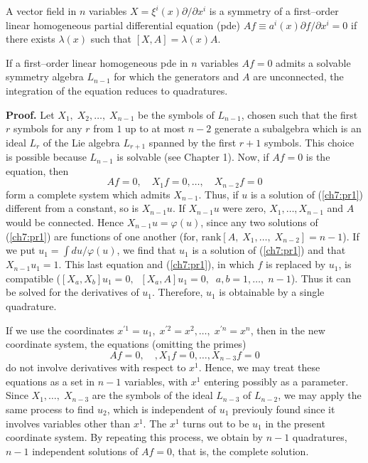 \begin{defi}
\begin{em}
A vector field in $n$ variables $X=\xi^i (x)\partial/\partial x^i$ is a
symmetry of a  first--order linear homogeneous partial differential equation
(pde) $Af\equiv a^i (x)\partial f/\partial x^i =0$ if there exists
$\lambda (x)$ such that $[X,A]=\lambda (x)A$.
\end{em}
\end{defi}

\begin{theo}[Eisenhart 1933]
\label{ch7:eins33}
\begin{em}
If a first--order linear homogeneous pde in $n$ variables $Af=0$
admits a solvable symmetry algebra
$L_{n-1}$ for which the generators and $A$ are unconnected, the integration
of the equation reduces to quadratures.
\end{em}
\end{theo}

{\bf Proof.}  Let $X_1,\;X_2,\ldots,\; X_{n-1}$ be the symbols of $L_{n-1}$,
chosen  such that the first $r$ symbols for any $r$ from $1$ up to at most
$n-2$ generate a subalgebra which is an ideal $L_r$ of the Lie algebra
$L_{r+1}$ spanned by the
first $r+1$ symbols. This choice is possible because $L_{n-1}$ is
solvable (see Chapter 1). Now, if $Af=0$ is the equation, then
\begin{equation}
\label{ch7:pr1}
Af=0,\quad X_1f=0,\ldots,\quad X_{n-2}f=0
\end{equation}
form a complete system which admits $X_{n-1}$. Thus, if $u$ is a solution of
(\ref{ch7:pr1}) different from a constant, so is $X_{n-1}u$. If $X_{n-1}u$ were
zero, $X_1,\ldots, X_{n-1}$ and $A$ would be connected. Hence
$X_{n-1}u=\varphi (u)$, since any two solutions of (\ref{ch7:pr1}) are functions
of one another (for, $\mbox{rank} [A,\; X_1,\ldots, \;X_{n-2}]=n-1$). If we
put $u_1=\int du/\varphi (u)$, we find that $u_1$ is a solution of
(\ref{ch7:pr1}) and that $X_{n-1}u_1=1$. This last equation and (\ref{ch7:pr1}), in
which $f$ is replaced by $u_1$, is compatible ($[X_a,X_b]u_1=0,\;\;
[X_a,A]u_1=0,\;\;a,b=1,\ldots,\;n-1$). Thus it can be solved for
the derivatives of $u_1$. Therefore, $u_1$ is  obtainable by a single
quadrature.

If we use the coordinates $x^{'1}=u_1,\;x^{'2}=x^2,\ldots,\;x^{'n}=x^n$, then
in the new coordinate system, the equations (omitting the primes)
\begin{equation}
\label{ch7:pr2}
Af=0,\quad,X_1f=0,\ldots,X_{n-3}f=0
\end{equation}
do not involve derivatives with respect to $x^1$. Hence, we may treat these
equations as a set in $n-1$ variables, with $x^1$ entering possibly as  a
parameter. Since $X_1,\ldots,\;X_{n-3}$ are the symbols of the ideal
$L_{n-3}$ of $L_{n-2}$, we may apply the same process to find  $u_2$,
which is independent of $u_1$ previouly found since it involves variables
other than $x^1$. The $x^1$ turns out to be $u_1$ in the present coordinate
system.
By repeating this process, we obtain by $n-1$ quadratures, $n-1$ independent
solutions of $Af=0$, that is, the complete solution.

